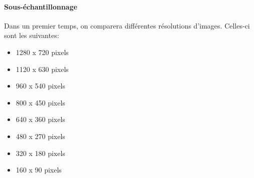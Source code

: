\paragraph{Sous-échantillonnage}\label{conception.traitement.eval.downsample}
Dans un premier temps, on comparera différentes résolutions d'images. Celles-ci sont les suivantes:
\begin{itemize}
    \item 1280 x 720 pixels
    \item 1120 x 630 pixels
    \item 960 x 540 pixels
    \item 800 x 450 pixels
    \item 640 x 360 pixels
    \item 480 x 270 pixels
    \item 320 x 180 pixels
    \item 160 x 90 pixels
\end{itemize}

